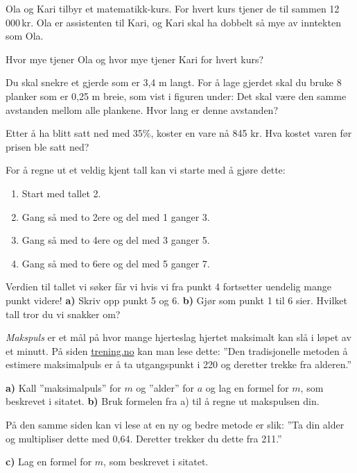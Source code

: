 



\opgt
\nes

Ola og Kari tilbyr et matematikk-kurs. For hvert kurs tjener de til sammen 12\,000\,kr. Ola er assistenten til Kari, og Kari skal ha dobbelt så mye av inntekten som Ola. \os

Hvor mye tjener Ola og hvor mye tjener Kari for hvert kurs?

Du skal snekre et gjerde som er 3,4 m langt. For å lage gjerdet skal du bruke 8 planker som er 0,25 m breie, som vist i figuren under:
Det skal være den samme avstanden mellom alle plankene. Hvor lang er denne avstanden?

Etter å ha blitt satt ned med 35\%, koster en vare nå 845 kr. Hva kostet varen før prisen ble satt ned?

 For å regne ut et veldig kjent tall kan vi starte med å gjøre dette: \os
\begin{enumerate}
	\item Start med tallet 2.
	\item Gang så med to 2ere og del med 1 ganger 3.
	\item Gang så med to 4ere og del med 3 ganger 5.
	\item Gang så med to 6ere og del med 5 ganger 7.
\end{enumerate}
Verdien til tallet vi søker får vi hvis vi fra punkt 4 fortsetter uendelig mange punkt videre!\os
\textbf{a)} Skriv opp punkt 5 og 6. \os
\textbf{b)} Gjør som punkt 1 til 6 sier. Hvilket tall tror du vi snakker om?

\textit{Makspuls} er et mål på hvor mange hjerteslag hjertet maksimalt kan slå i løpet av et minutt. På siden \href{http://www.trening.no/utholdenhet/ny-formel-for-beregning-av-makspuls/}{\color{blue}trening.no} kan man lese dette:\os
''Den tradisjonelle metoden å estimere maksimalpuls er å ta utgangspunkt i 220 og deretter trekke fra alderen.''\os

\textbf{a)} Kall ''maksimalpuls'' for $ m $ og ''alder'' for $ a $ og lag en formel for $ m $, som beskrevet i sitatet. \os
\textbf{b)} Bruk formelen fra a) til å regne ut makspulsen din.\vsk

På den samme siden kan vi lese at en ny og bedre metode er slik:\os
''Ta din alder og multipliser dette med 0,64. Deretter trekker du dette fra 211.''\os

\textbf{c)} Lag en formel for $ m $, som beskrevet i sitatet.\os

